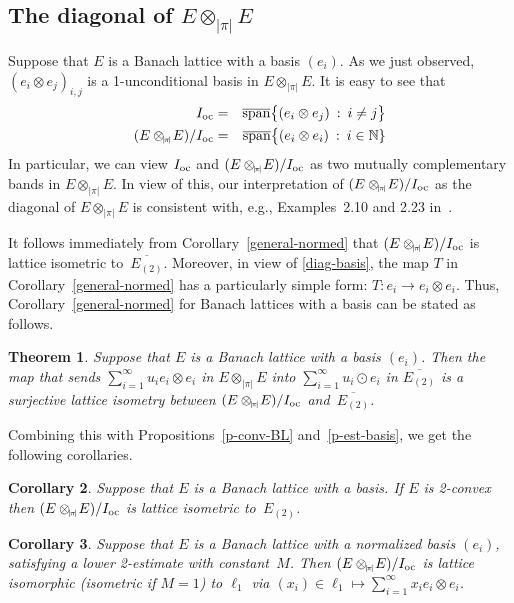 \documentclass[12pt]{amsart}
\theoremstyle{plain}
\newtheorem{theorem}{Theorem}
\newtheorem{corollary}[theorem]{Corollary}
\theoremstyle{definition}
\newcommand{\abs}[1]{\lvert#1\rvert}
\renewcommand{\mid}{\::\:}
\def\api{{\abs{\!\pi\!}}}
\def\ftp{\otimes_{\!\scriptscriptstyle\api}\!}
\def\Ioc{I_{\rm oc}}
\DeclareMathOperator{\cspan}{\overline{span}}
\begin{document}
\subsection{The diagonal of $E\ftp E$}

Suppose that $E$ is a Banach lattice with a basis
$(e_i)$. As we just observed, $(e_i\otimes e_j)_{i,j}$ is a
1-unconditional basis in $E\ftp E$. It is easy to see that
\begin{eqnarray}
  \notag \Ioc&=&\cspan\bigl\{(e_i\otimes e_j)\mid i\ne j\bigr\}\\
  \label{diag-basis}(E\ftp E)/\Ioc&=&\cspan\bigl\{(e_i\otimes e_i)\mid i\in\mathbb N\}
\end{eqnarray}
In particular, we can view $\Ioc$ and $(E\ftp E)/\Ioc$ as two mutually
complementary bands in $E\ftp E$.  In view of this, our interpretation
of $(E\ftp E)/\Ioc$ as the diagonal of $E\ftp E$ is consistent with,
e.g., Examples~2.10 and 2.23 in~\cite{Ryan:02}.

It follows immediately from Corollary~\ref{general-normed} that
$(E\ftp E)/\Ioc$ is lattice isometric to~$\overline{E_{(2)}}$.
Moreover, in view of \eqref{diag-basis}, the map $T$ in
Corollary~\ref{general-normed} has a particularly simple form:
$T\colon e_i\to e_i\otimes e_i$. Thus, Corollary~\ref{general-normed}
for Banach lattices with a basis can be stated as follows.

\begin{theorem}\label{m-basis}
  Suppose that $E$ is a Banach lattice with a
  basis $(e_i)$. Then the map that sends
  $\sum_{i=1}^\infty u_ie_i\otimes e_i$ in $E\ftp E$ into
  $\sum_{i=1}^\infty u_i\odot e_i$ in $\overline{E_{(2)}}$ is a surjective
  lattice isometry between $(E\ftp E)/\Ioc$ and~$\overline{E_{(2)}}$.
\end{theorem}


Combining this with Propositions~\ref{p-conv-BL}
and~\ref{p-est-basis}, we get the following corollaries.

\begin{corollary}
  Suppose that $E$ is a Banach lattice with a basis. If $E$ is
  2-convex then $(E\ftp E)/\Ioc$ is lattice isometric to~$E_{(2)}$.
\end{corollary}

\begin{corollary}\label{p-est-diag}
  Suppose that $E$ is a Banach lattice with a normalized basis
  $(e_i)$, satisfying a lower 2-estimate with constant~$M$. Then
  $(E\ftp E)/\Ioc$ is lattice isomorphic (isometric if $M=1$) to
  $\ell_1$ via $(x_i)\in\ell_1\mapsto\sum_{i=1}^\infty x_ie_i\otimes
  e_i$.
\end{corollary}
\end{document}
